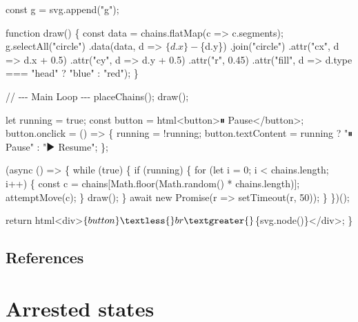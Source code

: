 \documentclass[
  letterpaper,
  enabledeprecatedfontcommands]{report}
\newenvironment{Shaded}{\begin{snugshade}}{\end{snugshade}}
\newcommand{\NormalTok}[1]{\textcolor[rgb]{0.00,0.23,0.31}{#1}}
\begin{document}
\begin{Shaded}
\begin{Highlighting}[]
\NormalTok{    const g = svg.append("g");}

\NormalTok{    function draw() \{}
\NormalTok{        const data = chains.flatMap(c =\textgreater{} c.segments);}
\NormalTok{        g.selectAll("circle")}
\NormalTok{            .data(data, d =\textgreater{} \textasciigrave{}$\{d.x\}{-}$\{d.y\}\textasciigrave{})}
\NormalTok{            .join("circle")}
\NormalTok{            .attr("cx", d =\textgreater{} d.x + 0.5)}
\NormalTok{            .attr("cy", d =\textgreater{} d.y + 0.5)}
\NormalTok{            .attr("r", 0.45)}
\NormalTok{            .attr("fill", d =\textgreater{} d.type === "head" ? "blue" : "red");}
\NormalTok{    \}}

\NormalTok{    // {-}{-}{-} Main Loop {-}{-}{-}}
\NormalTok{    placeChains();}
\NormalTok{    draw();}

\NormalTok{    let running = true;}
\NormalTok{    const button = html\textasciigrave{}\textless{}button\textgreater{}⏸ Pause\textless{}/button\textgreater{}\textasciigrave{};}
\NormalTok{    button.onclick = () =\textgreater{} \{}
\NormalTok{        running = !running;}
\NormalTok{        button.textContent = running ? "⏸ Pause" : "▶ Resume";}
\NormalTok{    \};}

\NormalTok{    (async () =\textgreater{} \{}
\NormalTok{        while (true) \{}
\NormalTok{            if (running) \{}
\NormalTok{                for (let i = 0; i \textless{} chains.length; i++) \{}
\NormalTok{                    const c = chains[Math.floor(Math.random() * chains.length)];}
\NormalTok{                    attemptMove(c);}
\NormalTok{                \}}
\NormalTok{                draw();}
\NormalTok{            \}}
\NormalTok{            await new Promise(r =\textgreater{} setTimeout(r, 50));}
\NormalTok{        \}}
\NormalTok{    \})();}

\NormalTok{    return html\textasciigrave{}\textless{}div\textgreater{}$\{button\}\textless{}br\textgreater{}$\{svg.node()\}\textless{}/div\textgreater{}\textasciigrave{};}
\NormalTok{\}}
\end{Highlighting}
\end{Shaded}

\section*{References}\label{references-3}


\chapter{Arrested states}\label{arrested-states}
\end{document}
